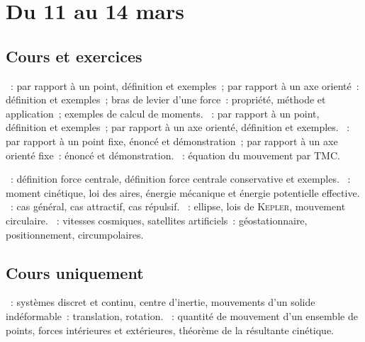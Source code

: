 \documentclass[a4paper, 12pt, final, garamond]{book}
\begin{document}
\setcounter{chapter}{19}

\chapter{Du 11 au 14 mars}

\section{Cours et exercices}
\begin{enumerate}[label=\Roman*]
    ~: par rapport à un point, définition et exemples~;
        par rapport à un axe orienté~: définition et exemples~; bras de levier
        d'une force~: propriété, méthode et application~; exemples de calcul de
        moments.
    ~: par rapport à un point, définition et exemples~;
        par rapport à un axe orienté, définition et exemples.
    ~: par rapport à un point fixe, énoncé et
        démonstration~; par rapport à un axe orienté fixe~: énoncé et
        démonstration.
    ~: équation du mouvement par TMC.
\end{enumerate}

\begin{enumerate}[label=\Roman*]
    ~: définition force centrale,
        définition force centrale conservative et exemples.
    ~: moment cinétique, loi des aires, énergie
        mécanique et énergie potentielle effective.
    ~: cas général, cas attractif, cas
    répulsif.
    ~: ellipse, lois de \textsc{Kepler}, mouvement
    circulaire.
    ~: vitesses cosmiques, satellites
        artificiels~: géostationnaire, positionnement, circumpolaires.
\end{enumerate}

\section{Cours uniquement}
\begin{enumerate}[label=\Roman*]
    ~: systèmes discret et continu, centre
    d'inertie, mouvements d'un solide indéformable~: translation, rotation.
    ~: quantité de mouvement d'un ensemble de points, forces
    intérieures et extérieures, théorème de la résultante cinétique.
\end{enumerate}
\end{document}
